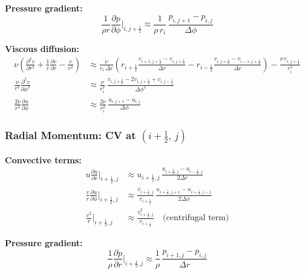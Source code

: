\textbf{Pressure gradient:}
\begin{equation}
    \frac{1}{\rho r}\frac{\partial p}{\partial\phi}\bigg|_{i,j+\frac{1}{2}}
    \approx \frac{1}{\rho\,r_i}\,\frac{p_{i,j+1}-p_{i,j}}{\Delta\phi}
\end{equation}

\textbf{Viscous diffusion:}
\begin{align}
    \nu\!\left(\frac{\partial^2 v}{\partial r^2}+\frac{1}{r}\frac{\partial v}{\partial r}-\frac{v}{r^2}\right)
    &\approx \frac{\nu}{r_i\,\Delta r}\!\left(
       r_{i+\frac{1}{2}}\frac{v_{i+1,j+\frac{1}{2}}-v_{i,j+\frac{1}{2}}}{\Delta r}
      -r_{i-\frac{1}{2}}\frac{v_{i,j+\frac{1}{2}}-v_{i-1,j+\frac{1}{2}}}{\Delta r}
    \right) - \frac{\nu\,v_{i,j+\frac{1}{2}}}{r_i^2}
    \\[4pt]
    \frac{\nu}{r^2}\frac{\partial^2 v}{\partial\phi^2}
    &\approx \frac{\nu}{r_i^2}\,
      \frac{v_{i,j+\frac{3}{2}}-2v_{i,j+\frac{1}{2}}+v_{i,j-\frac{1}{2}}}{\Delta\phi^2}
    \\[4pt]
    \frac{2\nu}{r^2}\frac{\partial u}{\partial\phi}
    &\approx \frac{2\nu}{r_i^2}\,
      \frac{\bar{u}_{i,j+1}-\bar{u}_{i,j}}{\Delta\phi}
\end{align}

\subsubsection{Radial Momentum: CV at $(i+\tfrac{1}{2},\,j)$}

\textbf{Convective terms:}
\begin{align}
    u\frac{\partial u}{\partial r}\bigg|_{i+\frac{1}{2},j}
    &\approx u_{i+\frac{1}{2},j}\,
      \frac{u_{i+\frac{3}{2},j}-u_{i-\frac{1}{2},j}}{2\Delta r}
    \\[4pt]
    \frac{v}{r}\frac{\partial u}{\partial\phi}\bigg|_{i+\frac{1}{2},j}
    &\approx \frac{\bar{v}_{i+\frac{1}{2},j}}{r_{i+\frac{1}{2}}}\,
      \frac{u_{i+\frac{1}{2},j+1}-u_{i+\frac{1}{2},j-1}}{2\Delta\phi}
    \\[4pt]
    \frac{v^2}{r}\bigg|_{i+\frac{1}{2},j}
    &\approx \frac{\bar{v}_{i+\frac{1}{2},j}^2}{r_{i+\frac{1}{2}}}
    \quad\text{(centrifugal term)}
\end{align}

\textbf{Pressure gradient:}
\begin{equation}
    \frac{1}{\rho}\frac{\partial p}{\partial r}\bigg|_{i+\frac{1}{2},j}
    \approx \frac{1}{\rho}\,\frac{p_{i+1,j}-p_{i,j}}{\Delta r}
\end{equation}

